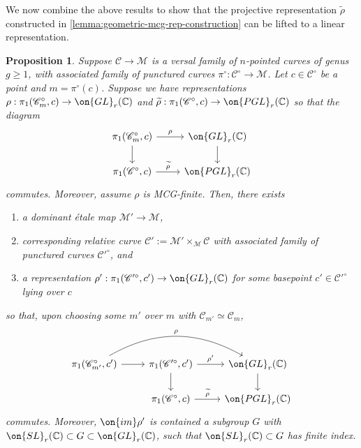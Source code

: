 \documentclass[12 pt]{amsart}
\theoremstyle{plain}
\newtheorem{proposition}[subsubsection]{Proposition}
\theoremstyle{definition}
\theoremstyle{remark}
\numberwithin{equation}{section}
\begin{document}
We now combine the above results to show that the projective representation $\widetilde{\rho}$ constructed in \autoref{lemma:geometric-mcg-rep-construction}
can be lifted to a linear representation.

\begin{proposition}
	\label{proposition:gl-lift}
	Suppose $\mathscr C \to \mathscr M$ is a versal family of $n$-pointed
	curves of genus $g\geq 1$, with associated family of punctured curves 
	$\pi^\circ: \mathscr{C}^\circ\to \mathscr{M}$. Let $c\in \mathscr{C}^\circ$ be a point and $m=\pi^\circ(c)$.
	Suppose we have representations $\rho: \pi_1(\mathscr C_m^\circ, c) \to
	\on{GL}_r(\mathbb C)$
	and $\widetilde{\rho}: \pi_1(\mathscr C^\circ, c) \to \on{PGL}_r(\mathbb
	C)$ so that the diagram
	\begin{equation}
		\label{equation:rho-and-tilde-rho-compatibility}
		\begin{tikzcd} 
			 \pi_1(\mathscr C_m^\circ, c) \ar[r, "\rho"] \ar {d} &
			 \on{GL}_r(\mathbb C) \ar {d} \\
			 \pi_1(\mathscr C^\circ, c) \ar[r, "\widetilde\rho"] & \on{PGL}_r(\mathbb C)
	\end{tikzcd}\end{equation}
	commutes.
	Moreover, assume $\rho$ is MCG-finite.
	Then, there exists 
	\begin{enumerate}
		\item a dominant \'etale map $\mathscr M' \to \mathscr M$,
		\item corresponding relative curve $\mathscr C' := \mathscr M'
	\times_{\mathscr M} \mathscr C$ with associated family of punctured curves ${\mathscr{C}'}^\circ$,
	and 
\item a representation $\rho' : \pi_1(\mathscr C'^\circ, c') \to
	\on{GL}_r(\mathbb C)$ for some basepoint $c' \in \mathscr C'^\circ$ lying over $c$
	\end{enumerate}
so that, 
	upon choosing some $m'$ over $m$ with $\mathscr C_{m'} \simeq \mathscr C_m$,
	\begin{equation}
		\label{equation:cover-rep-compatibility}
		\begin{tikzcd} 
			\pi_1(\mathscr C_{m'}^\circ, c') \ar{r} \ar[bend left]{rr}{\rho} &
			\pi_1(\mathscr C'^\circ, c') \ar {r}{\rho'} \ar {d} &
			 \on{GL}_r(\mathbb C) \ar {d} \\
			 & \pi_1(\mathscr C^\circ, c) \ar
			 {r}{\widetilde{\rho}} & \on{PGL}_r(\mathbb C)
	\end{tikzcd}\end{equation}
	commutes.	
	Moreover, $\on{im} \rho'$ is contained a subgroup $G$ with $\on{SL}_r(\mathbb
	C) \subset G \subset
	\on{GL}_r(\mathbb C)$, such that $\on{SL}_r(\mathbb C) \subset G$ has
	finite index.
\end{proposition}
\end{document}
